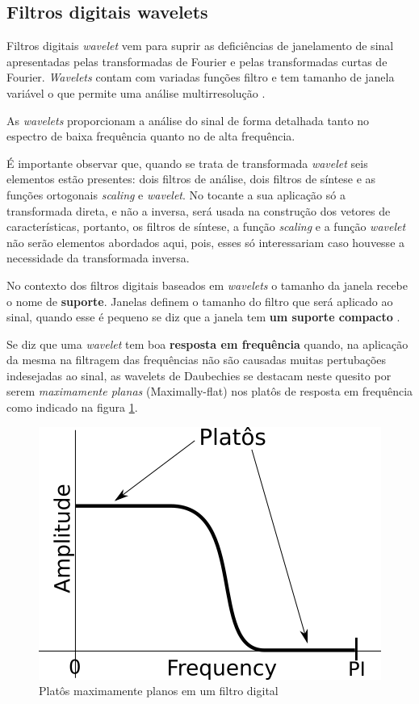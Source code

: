 \begin{myenv}{1.5}
			\subsection{Filtros digitais wavelets}
				\par Filtros digitais \textit{wavelet} vem para suprir as deficiências de janelamento de sinal apresentadas pelas transformadas de Fourier e pelas transformadas curtas de Fourier. \textit{Wavelets} contam com variadas funções filtro e tem tamanho de janela variável o que permite uma análise multirresolução \cite{Rod5254905}.
				
				\par As \textit{wavelets} proporcionam a análise do sinal de forma detalhada tanto no espectro de baixa frequência quanto no de alta frequência.
				
				\par É importante observar que, quando se trata de transformada \textit{wavelet} seis elementos estão presentes: dois filtros de análise, dois filtros de síntese e as funções ortogonais \textit{scaling} e \textit{wavelet}. No tocante a sua aplicação só a transformada direta, e não a inversa, será usada na construção dos vetores de características, portanto, os filtros de síntese, a função \textit{scaling} e a função \textit{wavelet} não serão elementos abordados aqui, pois, esses só interessariam caso houvesse a necessidade da transformada inversa.
	
				\par No contexto dos filtros digitais baseados em \textit{wavelets} o tamanho da janela recebe o nome de \textbf{suporte}. Janelas definem o tamanho do filtro que será aplicado ao sinal, quando esse é pequeno se diz que a janela tem \textbf{um suporte compacto} \cite{robi2003}.
			
				\par Se diz que uma \textit{wavelet} tem boa \textbf{resposta em frequência} quando, na aplicação da mesma na filtragem das frequências não são causadas muitas pertubações indesejadas ao sinal, as wavelets de Daubechies se destacam neste quesito por serem \textit{maximamente planas} (Maximally-flat) nos platôs de resposta em frequência como indicado na figura \ref{fig:daubechies}.

				\begin{figure}[h]
					\centering
					\includegraphics[width=0.3\linewidth]{images/daubechies}
					\caption{Platôs maximamente planos em um filtro digital}
					\label{fig:daubechies}
				\end{figure}


\end{myenv}
